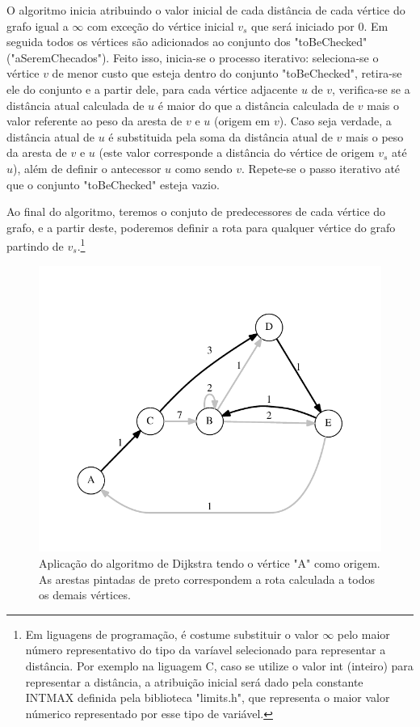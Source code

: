 O algoritmo inicia atribuindo o valor inicial de cada distância de cada vértice do grafo igual a $\infty$ com exceção do vértice inicial $v_{s}$ que será iniciado por 0. Em seguida todos os vértices são adicionados ao conjunto dos "toBeChecked" ("aSeremChecados"). Feito isso, inicia-se o processo iterativo: seleciona-se o vértice $v$ de menor custo que esteja dentro do conjunto "toBeChecked", retira-se ele do conjunto e a partir dele, para cada vértice adjacente $u$ de $v$, verifica-se se a distância atual calculada de $u$ é maior do que a distância calculada de $v$ mais o valor referente ao peso da aresta de $v$ e $u$ (origem em $v$). Caso seja verdade, a distância atual de $u$ é substituida pela soma da distância atual de $v$ mais o peso da aresta de $v$ e $u$ (este valor corresponde a distância do vértice de origem $v_{s}$ até $u$), além de definir o antecessor $u$ como sendo $v$. Repete-se o passo iterativo até que o conjunto "toBeChecked" esteja vazio.

Ao final do algoritmo, teremos o conjuto de predecessores de cada vértice do grafo, e a partir deste, poderemos definir a rota para qualquer vértice do grafo partindo de $v_{s}$.\footnote{Em liguagens de programação, é costume substituir o valor $\infty$ pelo maior número representativo do tipo da varíavel selecionado para representar a distância. Por exemplo na liguagem C, caso se utilize o valor int (inteiro) para representar a distância, a atribuição inicial será dado pela constante INT\underline{\space}MAX  definida pela biblioteca "limits.h", que representa o maior valor númerico representado por esse tipo de variável.}

\begin{figure}[H]
\centering
\includegraphics[width=1.\textwidth]{figuras/grafo-dijkstra} 
\caption{Aplicação do algoritmo de Dijkstra tendo o vértice "A" como origem. As arestas pintadas de preto correspondem a rota calculada a todos os demais vértices.}
\label{fig-dijkstra-algoritmo-grafo}
\end{figure}


